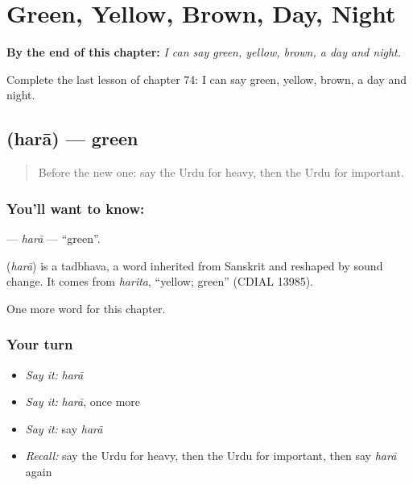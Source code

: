 
\chapter{Green, Yellow, Brown, Day, Night}
\label{ch:ur-green-yellow-brown-day-night}

\begin{chapteropening}
\textbf{By the end of this chapter:} \emph{I can say green, yellow, brown, a day and night.}

Complete the last lesson of chapter 74: I can say green, yellow, brown, a day and night.
\end{chapteropening}

\section[\texorpdfstring{\ur{ہرا} (harā)}{ہرا (harā)}]{ (harā) — green}

\label{lesson:UR-C74-hara}



\begin{quote}
Before the new one: say the Urdu for heavy, then the Urdu for important.
\end{quote}

\subsection*{You'll want to know: }
\textbf{} — \emph{harā} — \textquotedblleft{}green\textquotedblright{}.

\begin{cousinweb}
\textbf{} (\emph{harā}) is a tadbhava, a word inherited from Sanskrit and reshaped by sound change. It comes from \emph{harita}, \textquotedblleft{}yellow; green\textquotedblright{} (CDIAL 13985).
\end{cousinweb}

\begin{grammarlens}[title={What you've built}]
One more word for this chapter.
\end{grammarlens}

\subsection*{Your turn}
\begin{itemize}
\raggedright
  \item \emph{Say it:} \emph{harā}
  \item \emph{Say it:} \emph{harā}, once more
  \item \emph{Say it:} say \emph{harā}
  \item \emph{Recall:} say the Urdu for heavy, then the Urdu for important, then say \emph{harā} again
\end{itemize}

